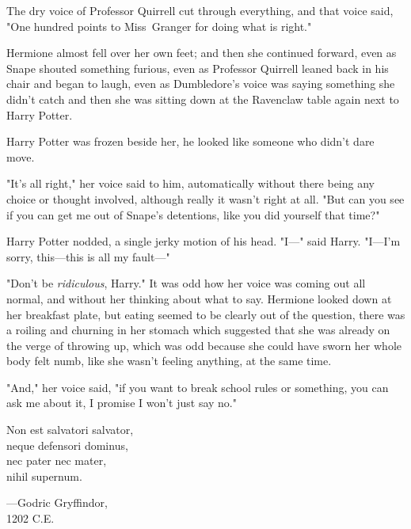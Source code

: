 The dry voice of Professor Quirrell cut through everything, and that voice
said, "One hundred points to Miss~Granger for doing what is right."

Hermione almost fell over her own feet; and then she continued forward, even as
Snape shouted something furious, even as Professor Quirrell leaned back in his
chair and began to laugh, even as Dumbledore's voice was saying something she
didn't catch and then she was sitting down at the Ravenclaw table again next to
Harry Potter.

Harry Potter was frozen beside her, he looked like someone who didn't dare move.

"It's all right," her voice said to him, automatically without there being any
choice or thought involved, although really it wasn't right at all. "But can
you see if you can get me out of Snape's detentions, like you did yourself that
time?"

Harry Potter nodded, a single jerky motion of his head. "I—" said Harry.
"I—I'm sorry, this—this is all my fault—"

"Don't be \emph{ridiculous}, Harry." It was odd how her voice was coming out
all normal, and without her thinking about what to say. Hermione looked down at
her breakfast plate, but eating seemed to be clearly out of the question, there
was a roiling and churning in her stomach which suggested that she was already
on the verge of throwing up, which was odd because she could have sworn her
whole body felt numb, like she wasn't feeling anything, at the same time.

"And," her voice said, "if you want to break school rules or something, you can
ask me about it, I promise I won't just say no."
\later
\begin{center}
Non est salvatori salvator,\\
neque defensori dominus,\\
nec pater nec mater,\\
nihil supernum.

—Godric Gryffindor,\\
1202 C.E.
\end{center}
